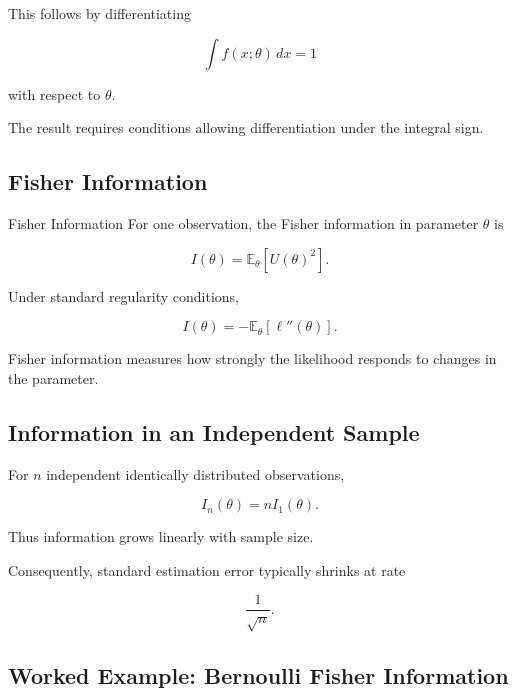 This follows by differentiating

\[
\int f(x;\theta)\,dx=1
\]

with respect to \(\theta\).

The result requires conditions allowing differentiation under the
integral sign.

\subsection{Fisher Information}
\label{subsec:fisher-information}

\begin{definitionbox}{Fisher Information}
For one observation, the Fisher information in parameter \(\theta\) is

\[
\boxed{
I(\theta)
=
\mathbb{E}_\theta
\left[
U(\theta)^2
\right].
}
\]
\end{definitionbox}

Under standard regularity conditions,

\[
\boxed{
I(\theta)
=
-
\mathbb{E}_\theta
\left[
\ell''(\theta)
\right].
}
\]

Fisher information measures how strongly the likelihood responds to
changes in the parameter.

\subsection{Information in an Independent Sample}
\label{subsec:fisher-information-sample}

For \(n\) independent identically distributed observations,

\[
\boxed{
I_n(\theta)
=
nI_1(\theta).
}
\]

Thus information grows linearly with sample size.

Consequently, standard estimation error typically shrinks at rate

\[
\boxed{
\frac1{\sqrt{n}}.
}
\]

\subsection{Worked Example: Bernoulli Fisher Information}
\label{subsec:worked-bernoulli-information}

